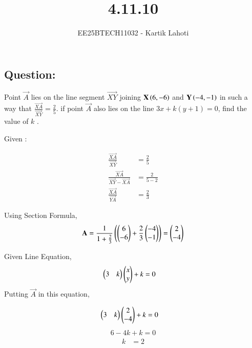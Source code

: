 \documentclass[journal]{IEEEtran}
\numberwithin{equation}{enumi}
\numberwithin{figure}{enumi}
\begin{document}

\vspace{3cm}

\title{4.11.10}
\author{EE25BTECH11032 - Kartik Lahoti}
\maketitle

\subsection*{Question: } 
Point $\vec{A}$ lies on the line segment $\vec{XY}$  joining $\mathbf{X}\left(6,-6\right)$ and $\mathbf{Y}\left(-4,-1\right)$ in such a way that $\frac{\vec{XA}}{\vec{XY}} = \frac{2}{5}$. if point $\vec{A}$ also lies on the line $3x + k(y+1) = 0$, find the value of $k$ .

\solution 

Given : 
\begin{table}[H]
    \centering
    
    \caption*{}
    \label{tab:placeholder_1}
\end{table}


\begin{align}
    \frac{\vec{XA}}{\vec{XY}} &= \frac{2}{5}\\ 
    \frac{\vec{XA}}{\vec{XY}-\vec{XA}} &= \frac{2}{5-2}\\
    \frac{\vec{XA}}{\vec{YA}} &= \frac{2}{3}
\end{align}

Using Section Formula, 
\begin{align}
    \mathbf{A} =  \frac{1}{1 + \frac{2}{3}}\left(\begin{pmatrix}6 \\ -6\end{pmatrix} + \frac{2}{3}\begin{pmatrix}-4\\-1\end{pmatrix}\right) = \begin{pmatrix}2 \\ -4\end{pmatrix}
\end{align}

Given Line Equation, 
\begin{align}
        \begin{pmatrix}3 & k\end{pmatrix}\begin{pmatrix}x \\ y\end{pmatrix} + k &= 0  
\end{align}
Putting $\vec{A}$ in this equation,

\begin{align}
    \begin{pmatrix}3 & k\end{pmatrix}\begin{pmatrix}2 \\ -4\end{pmatrix} + k &= 0 
\end{align}
\begin{align}
    6 - 4k + k = 0 
\end{align}
\begin{align}
    k &= 2
\end{align}
\end{document}
